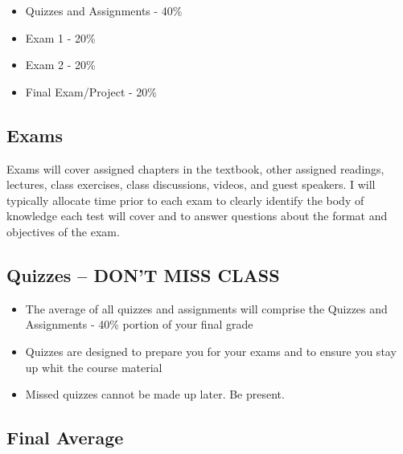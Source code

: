 \documentclass[
]{book}
\providecommand{\tightlist}{%
  \setlength{\itemsep}{0pt}\setlength{\parskip}{0pt}}
\begin{document}
\begin{itemize}
\tightlist
\item
  Quizzes and Assignments - 40\%
\item
  Exam 1 - 20\%
\item
  Exam 2 - 20\%
\item
  Final Exam/Project - 20\%
\end{itemize}

\hypertarget{exams}{%
\subsection*{Exams}\label{exams}}

Exams will cover assigned chapters in the textbook, other assigned readings, lectures, class exercises, class discussions, videos, and guest speakers. I will typically allocate time prior to each exam to clearly identify the body of knowledge each test will cover and to answer questions about the format and objectives of the exam.

\hypertarget{quizzes-dont-miss-class}{%
\subsection*{\texorpdfstring{Quizzes -- \textbf{DON'T MISS CLASS}}{Quizzes -- DON'T MISS CLASS}}\label{quizzes-dont-miss-class}}

\begin{itemize}
\tightlist
\item
  The average of all quizzes and assignments will comprise the Quizzes and Assignments - 40\% portion of your final grade
\item
  Quizzes are designed to prepare you for your exams and to ensure you stay up whit the course material
\item
  Missed quizzes cannot be made up later. Be present.
\end{itemize}

\hypertarget{final-average}{%
\subsection*{Final Average}\label{final-average}}
\end{document}
